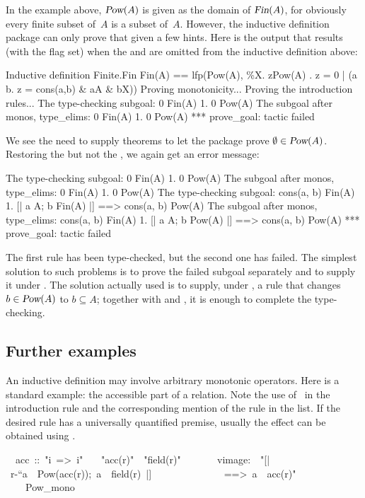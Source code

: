 In the example above, $\emph{\sl Pow}(A)$ is given as the domain of
$\emph{\sl Fin}(A)$, for obviously every finite subset of~$A$ is a subset
of~$A$.  However, the inductive definition package can only prove that given a
few hints.
Here is the output that results (with the flag set) when the
 and  are omitted from the inductive
definition above:
\begin{alltt*}\isastyleminor
Inductive definition Finite.Fin
Fin(A) ==
lfp(Pow(A),
    \%X. {z\isasymin{}Pow(A) . z = 0 | ({\isasymexists}a b. z = cons(a,b) & a\isasymin{}A & b\isasymin{}X)})
  Proving monotonicity...
\ttbreak
  Proving the introduction rules...
The type-checking subgoal:
0 \isasymin Fin(A)
 1. 0 \isasymin Pow(A)
\ttbreak
The subgoal after monos, type_elims:
0 \isasymin Fin(A)
 1. 0 \isasymin Pow(A)
*** prove_goal: tactic failed
\end{alltt*}
We see the need to supply theorems to let the package prove
$\emptyset\in\emph{\sl Pow}(A)$.  Restoring the  but not the
, we again get an error message:
\begin{alltt*}\isastyleminor
The type-checking subgoal:
0 \isasymin Fin(A)
 1. 0 \isasymin Pow(A)
\ttbreak
The subgoal after monos, type_elims:
0 \isasymin Fin(A)
 1. 0 \isasymin Pow(A)
\ttbreak
The type-checking subgoal:
cons(a, b) \isasymin Fin(A)
 1. [| a \isasymin A; b \isasymin Fin(A) |] ==> cons(a, b) \isasymin Pow(A)
\ttbreak
The subgoal after monos, type_elims:
cons(a, b) \isasymin Fin(A)
 1. [| a \isasymin A; b \isasymin Pow(A) |] ==> cons(a, b) \isasymin Pow(A)
*** prove_goal: tactic failed
\end{alltt*}
The first rule has been type-checked, but the second one has failed.  The
simplest solution to such problems is to prove the failed subgoal separately
and to supply it under .  The solution actually used is
to supply, under , a rule that changes
$b\in\emph{\sl Pow}(A)$ to $b\subseteq A$; together with 
and , it is enough to complete the type-checking.



\subsection{Further examples}

An inductive definition may involve arbitrary monotonic operators.  Here is a
standard example: the accessible part of a relation.  Note the use
of~ in the introduction rule and the corresponding mention of the
rule  in the  list.  If the desired rule has a
universally quantified premise, usually the effect can be obtained using
.
\begin{isabelle}
\ \ acc\ ::\ "i\ =>\ i"\isanewline
{}\isanewline
\ \ \ "acc(r)"\ \isasymsubseteq \ "field(r)"\isanewline
\ \ \isanewline
\ \ \ \ vimage:\ \ "[|\ r-``\isacharbraceleft a\isacharbraceright\ \isasymin\ Pow(acc(r));\ a\ \isasymin \ field(r)\ |]
\isanewline
\ \ \ \ \ \ \ \ \ \ \ \ \ \ ==>\ a\ \isasymin \ acc(r)"\isanewline
\ \ \ \ Pow\_mono
\end{isabelle}

